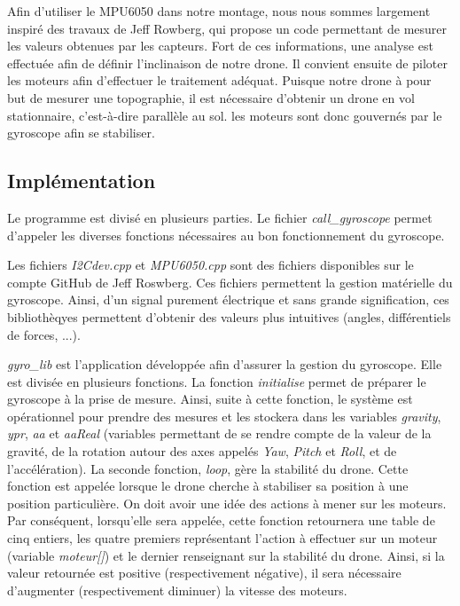 \documentclass[a4paper,10pt]{report}
\begin{document}
	  Afin d'utiliser le MPU6050 dans notre montage, nous nous sommes 
largement inspiré des travaux de Jeff Rowberg\cite{jeffrwork}, qui propose un 
code permettant de mesurer les valeurs obtenues par les capteurs. Fort de ces 
informations, une analyse est effectuée afin de définir l'inclinaison de notre 
drone. Il convient ensuite de piloter les moteurs afin d'effectuer le 
traitement adéquat. Puisque notre drone à pour but de mesurer une topographie, 
il est nécessaire d'obtenir un drone en vol stationnaire, c'est-à-dire 
parallèle au sol. les moteurs sont donc gouvernés par le gyroscope afin se 
stabiliser.
  
	\subsection{Implémentation}
	  Le programme est divisé en plusieurs parties. Le fichier 
\textit{call\_gyroscope} permet d'appeler les diverses fonctions nécessaires au 
bon fonctionnement du gyroscope. 

	  Les fichiers \textit{I2Cdev.cpp} et \textit{MPU6050.cpp} sont des 
fichiers disponibles sur le compte GitHub de Jeff 
Roswberg\cite{jeff_rowberg_lib}. Ces fichiers permettent la gestion matérielle 
du gyroscope. Ainsi, d'un signal purement électrique et sans grande 
signification, ces bibliothèqyes permettent d'obtenir des valeurs plus 
intuitives (angles, différentiels de forces, ...).

	  \textit{gyro\_lib} est l'application développée afin d'assurer la 
gestion du gyroscope. Elle est divisée en plusieurs fonctions. La fonction 
\textit{initialise} permet de préparer le gyroscope à la prise de mesure. 
Ainsi, suite à cette fonction, le système est opérationnel pour prendre des 
mesures et les stockera dans les variables \textit{gravity}, \textit{ypr}, 
\textit{aa} et \textit{aaReal} (variables permettant de se rendre 
compte de la valeur de la gravité, de la rotation autour des axes appelés 
\textit{Yaw}, \textit{Pitch} et \textit{Roll}, et de l'accélération). La 
seconde fonction, \textit{loop},  gère la stabilité du drone. Cette fonction 
est appelée lorsque le drone cherche à stabiliser sa position à une position 
particulière. On doit avoir une idée des actions à mener sur les moteurs. Par 
conséquent, lorsqu'elle sera appelée, cette fonction retournera une table de 
cinq entiers, les quatre premiers représentant l'action à effectuer sur un 
moteur (variable \textit{moteur[]}) et le dernier renseignant sur la stabilité 
du drone. Ainsi, si la valeur retournée est positive (respectivement négative), 
il sera nécessaire d'augmenter (respectivement diminuer) la vitesse des 
moteurs. 
\end{document}
